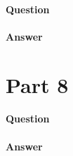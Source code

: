 \documentclass[11pt,twoside]{article}
\begin{document}
\paragraph{Question}


\paragraph{Answer}


\clearpage

\section*{Part 8}
\paragraph{Question}


\paragraph{Answer}


\clearpage
\end{document}
